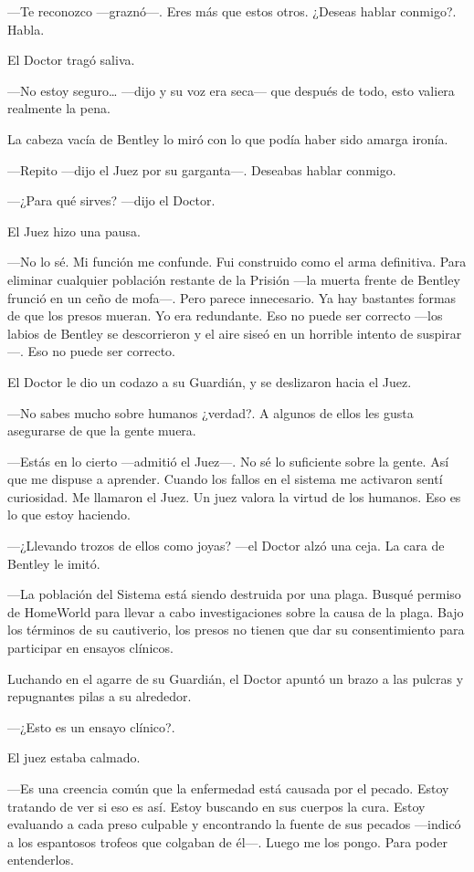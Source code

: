 ---Te reconozco ---graznó---. Eres más que estos otros. ¿Deseas hablar
conmigo?. Habla.

El Doctor tragó saliva.

---No estoy seguro\ldots{} ---dijo y su voz era seca--- que después de
todo, esto valiera realmente la pena.

La cabeza vacía de Bentley lo miró con lo que podía haber sido amarga
ironía.

---Repito ---dijo el Juez por su garganta---. Deseabas hablar conmigo.

---¿Para qué sirves? ---dijo el Doctor.

El Juez hizo una pausa.

---No lo sé. Mi función me confunde. Fui construido como el arma
definitiva. Para eliminar cualquier población restante de la Prisión
---la muerta frente de Bentley frunció en un ceño de mofa---. Pero
parece innecesario. Ya hay bastantes formas de que los presos mueran. Yo
era redundante. Eso no puede ser correcto ---los labios de Bentley se
descorrieron y el aire siseó en un horrible intento de suspirar---. Eso
no puede ser correcto.

El Doctor le dio un codazo a su Guardián, y se deslizaron hacia el Juez.

---No sabes mucho sobre humanos ¿verdad?. A algunos de ellos les gusta
asegurarse de que la gente muera.

---Estás en lo cierto ---admitió el Juez---. No sé lo suficiente sobre
la gente. Así que me dispuse a aprender. Cuando los fallos en el sistema
me activaron sentí curiosidad. Me llamaron el Juez. Un juez valora la
virtud de los humanos. Eso es lo que estoy haciendo.

---¿Llevando trozos de ellos como joyas? ---el Doctor alzó una ceja. La
cara de Bentley le imitó.

---La población del Sistema está siendo destruida por una plaga. Busqué
permiso de HomeWorld para llevar a cabo investigaciones sobre la causa
de la plaga. Bajo los términos de su cautiverio, los presos no tienen
que dar su consentimiento para participar en ensayos clínicos.

Luchando en el agarre de su Guardián, el Doctor apuntó un brazo a las
pulcras y repugnantes pilas a su alrededor.

---¿Esto es un ensayo clínico?.

El juez estaba calmado.

---Es una creencia común que la enfermedad está causada por el pecado.
Estoy tratando de ver si eso es así. Estoy buscando en sus cuerpos la
cura. Estoy evaluando a cada preso culpable y encontrando la fuente de
sus pecados ---indicó a los espantosos trofeos que colgaban de él---.
Luego me los pongo. Para poder entenderlos.

